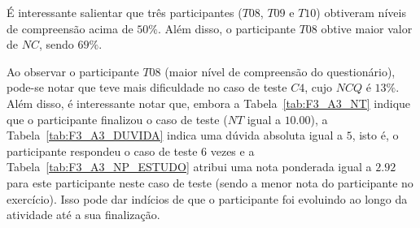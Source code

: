 É interessante salientar que três participantes ($T08$, $T09$ e $T10$) obtiveram níveis de compreensão acima de $50\%$. Além disso, o participante $T08$ obtive maior valor de $NC$, sendo $69\%$.

Ao observar o participante $T08$ (maior nível de compreensão do questionário), pode-se notar que teve mais dificuldade no caso de teste $C4$, cujo $NCQ$ é $13\%$. Além disso, é interessante notar que, embora a Tabela~\ref{tab:F3_A3_NT} indique que o participante finalizou o caso de teste ($NT$ igual a $10.00$), a Tabela~\ref{tab:F3_A3_DUVIDA} indica uma dúvida absoluta igual a $5$, isto é, o participante respondeu o caso de teste 6 vezes e a Tabela~\ref{tab:F3_A3_NP_ESTUDO} atribui uma nota ponderada igual a $2.92$ para este participante neste caso de teste (sendo a menor nota do participante no exercício). Isso pode dar indícios de que o participante foi evoluindo ao longo da atividade até a sua finalização.


